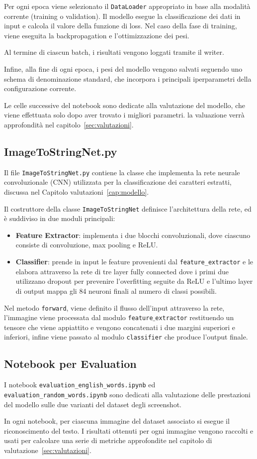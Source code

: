 Per ogni epoca viene selezionato il \texttt{DataLoader} appropriato in base alla modalità corrente (training o validation).  
Il modello esegue la classificazione dei dati in input e calcola il valore della funzione di loss.  
Nel caso della fase di training, viene eseguita la backpropagation e l'ottimizzazione dei pesi.

Al termine di ciascun batch, i risultati vengono loggati tramite il writer.

Infine, alla fine di ogni epoca, i pesi del modello vengono salvati seguendo uno schema di denominazione standard, che incorpora i principali iperparametri della configurazione corrente.

Le celle successive del notebook sono dedicate alla valutazione del modello, che viene effettuata solo dopo aver trovato i migliori parametri. la valuazione verrà approfondità nel capitolo~\ref{sec:valutazioni}.

\subsection*{ImageToStringNet.py}
Il file \texttt{ImageToStringNet.py} contiene la classe che implementa la rete neurale convoluzionale (CNN) utilizzata per la classificazione dei caratteri estratti, discussa nel Capitolo valutazioni~\ref{cap:modello}. 

Il costruttore della classe \texttt{ImageToStringNet} definisce l'architettura della rete, ed è suddiviso in due moduli principali:
\begin{itemize}
    \item \textbf{Feature Extractor}: implementa i due blocchi convoluzionali, dove ciascuno consiste di convoluzione, max pooling e ReLU.
    \item \textbf{Classifier}: prende in input le feature provenienti dal \texttt{feature\_extractor} e le elabora attraverso la rete di tre layer fully connected dove i primi due utilizzano dropout per prevenire l'overfitting seguite da ReLU e l'ultimo layer di output mappa gli 84 neuroni finali al numero di classi possibili.
\end{itemize}

Nel metodo \texttt{forward}, viene definito il flusso dell'input attraverso la rete, l'immagine viene processata dal modulo \texttt{feature$\_$extractor} restituendo un tensore che viene appiattito e vengono concatenati i due margini superiori e inferiori, infine viene passato al modulo \texttt{classifier} che produce l'output finale.

\subsection*{Notebook per Evaluation}
I notebook \texttt{evaluation\_english\_words.ipynb} ed \\  \texttt{evaluation\_random\_words.ipynb} sono dedicati alla valutazione delle prestazioni del modello sulle due varianti del dataset degli screenshot. 

In ogni notebook, per ciascuna immagine del dataset associato si esegue il riconoscimento del testo. I risultati ottenuti per ogni immagine vengono raccolti e usati per calcolare una serie di metriche approfondite nel capitolo di valutazione~\ref{sec:valutazioni}.